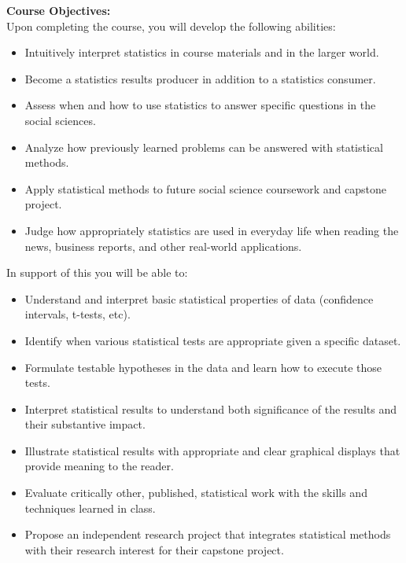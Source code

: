 \documentclass[11pt]{article}
\begin{document}
\vspace{0.5cm}
\large \textbf{Course Objectives:}\\[0.5em]
Upon completing the course, you will develop the following abilities:
\begin{itemize}
    \item Intuitively interpret statistics in course materials and in the larger world.
    \item Become a statistics results producer in addition to a statistics consumer.
    \item Assess when and how to use statistics to answer specific questions in the social sciences.
    \item Analyze how previously learned problems can be answered with statistical methods.
    \item Apply statistical methods to future social science coursework and capstone project.
    \item Judge how appropriately statistics are used in everyday life when reading the news, business reports, and other real-world applications.
\end{itemize}

In support of this you will be able to:
\begin{itemize}
    \item Understand and interpret basic statistical properties of data (confidence intervals, t-tests, etc).
    \item Identify when various statistical tests are appropriate given a specific dataset.
    \item Formulate testable hypotheses in the data and learn how to execute those tests.
    \item Interpret statistical results to understand both significance of the results and their substantive impact.
    \item Illustrate statistical results with appropriate and clear graphical displays that provide meaning to the reader.
    \item Evaluate critically other, published, statistical work with the skills and techniques learned in class.
    \item Propose an independent research project that integrates statistical methods with their research interest for their capstone project.
\end{itemize}
\end{document}
